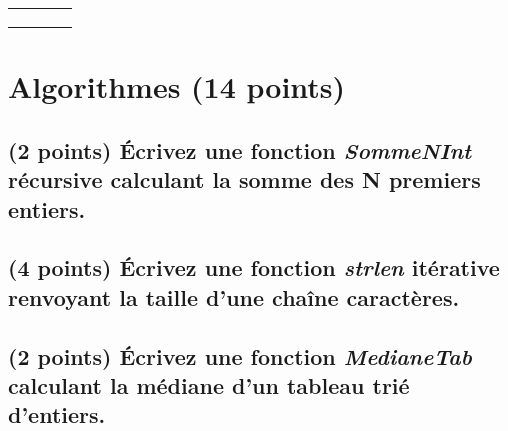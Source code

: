 \documentclass[11pt,a4paper]{article}
\begin{document}
\begin{table}[h!]
\begin{minipage}{0.4\textwidth}
\begin{tabular}{| C{1cm} | C{1cm} | C{1cm} | C{1cm} |}
             &     &     &       \\
        \hline
             &     &     &       \\
             &     &     &       \\
             &     &     &       \\
        \hline
    \end{tabular}
  \end{minipage}
\end{table}


\vfillLast
\newpage

\section{Algorithmes (14 points)}

\subsection{(2 points) \'Ecrivez une fonction \og \textit{SommeNInt} \fg{} récursive calculant la somme des N premiers entiers. }

\bigskip

\begin{center}
\end{center}

\smallskip


\subsection{(4 points) \'Ecrivez une fonction \og \textit{strlen} \fg{} itérative renvoyant la taille d'une chaîne caractères. }

\bigskip

\begin{center}
\end{center}


\newpage

\vfillFirst

\subsection{(2 points) \'Ecrivez une fonction \og \textit{MedianeTab} \fg{} calculant la médiane d'un tableau trié d'entiers. }
\end{document}
